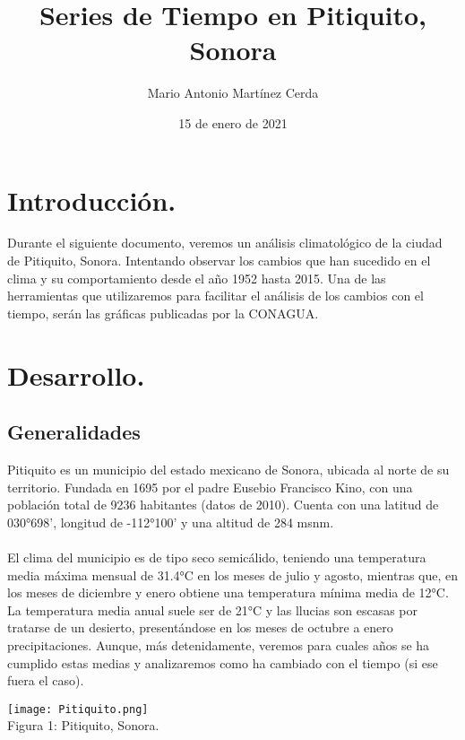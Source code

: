 \documentclass{article}
\title{Series de Tiempo en Pitiquito, Sonora}
\author{Mario Antonio Martínez Cerda}
\date{15 de enero de 2021}
\begin{document}
\maketitle
\section{Introducción.}

Durante el siguiente documento, veremos un análisis climatológico de la ciudad de Pitiquito, Sonora. Intentando observar los cambios que han sucedido en el clima y su comportamiento desde el año 1952 hasta 2015. Una de las herramientas que utilizaremos para facilitar el análisis de los cambios con el tiempo, serán las gráficas publicadas por la CONAGUA.
\maketitle

\section{Desarrollo.}
\subsection{Generalidades}
Pitiquito es un municipio del estado mexicano de Sonora, ubicada al norte de su territorio. Fundada en 1695 por el padre Eusebio Francisco Kino, con una población total de 9236 habitantes (datos de 2010). Cuenta con una latitud de 030°698', longitud de -112°100' y una altitud de 284 msnm.\\\\El clima del municipio es de tipo seco semicálido, teniendo una temperatura media máxima mensual de 31.4°C en los meses de julio y agosto, mientras que, en los meses de diciembre y enero obtiene una temperatura mínima media de 12°C. La temperatura media anual suele ser de 21°C y las llucias son escasas por tratarse de un desierto, presentándose en los meses de octubre a enero precipitaciones. Aunque, más detenidamente, veremos para cuales años se ha cumplido estas medias y analizaremos como ha cambiado con el tiempo (si ese fuera el caso).
\begin{center}
\texttt{[image: Pitiquito.png]}\\
\caption{\small Figura 1: Pitiquito, Sonora.}
\end{center}
\end{document}
